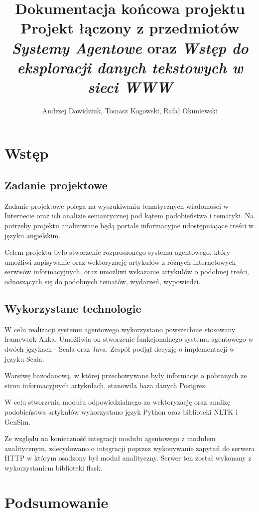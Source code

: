 \documentclass[a4paper]{article}
\title{\Large{Dokumentacja końcowa projektu} \\
Projekt łączony z przedmiotów \textit{Systemy Agentowe} oraz \textit{Wstęp do eksploracji danych tekstowych w sieci WWW}}
\author{Andrzej Dawidziuk, Tomasz Kogowski, Rafał Okuniewski}
\begin{document}
\maketitle

\section{Wstęp}

\subsection{Zadanie projektowe}
\par Zadanie projektowe polega na wyszukiwaniu tematycznych wiadomości w Internecie oraz ich analizie semantycznej pod kątem podobieństwa i tematyki. Na potrzeby projektu analizowane będą portale informacyjne udostępniające treści w języku angielskim.
\par Celem projektu było stworzenie rozproszonego systemu agentowego, który umożliwi zapisywanie oraz wektoryzację artykułów z różnych internetowych serwisów informacyjnych, oraz umożliwi wskazanie artykułów o podobnej treści, odnoszących się do podobnych tematów, wydarzeń, wypowiedzi.

\subsection{Wykorzystane technologie}

\par W celu realizacji systemu agentowego wykorzystano powszechnie stosowany framework Akka. Umożliwia on stworzenie funkcjonalnego systemu agentowego w dwóch językach - Scala oraz Java. Zespół podjął decyzję o implementacji w języku Scala.
\par Warstwę bazodanową, w której przechowywane były informacje o pobranych ze stron informacyjnych artykułach, stanowiła baza danych Postgres.
\par W celu stworzenia modułu odpowiedzialnego za wektoryzację oraz analizę podobieństwa artykułów wykorzystano język Python oraz biblioteki NLTK i GenSim.
\par Ze względu na konieczność integracji modułu agentowego z modułem analitycznym, zdecydowano o integracji poprzez wykonywanie zapytań do serwera HTTP w którym osadzony był moduł analityczny. Serwer ten został wykonany z wykorzystaniem biblioteki flask.







\section{Podsumowanie}



\end{document}
